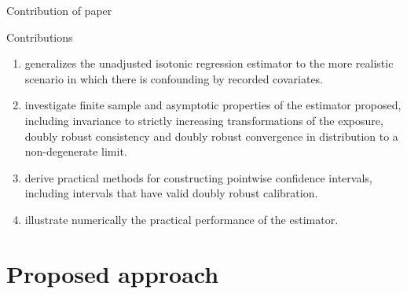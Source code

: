 \documentclass{beamer}
\newcommand{\fn}[1]{{\footnotesize #1}}
\begin{document}
\begin{frame}{Contribution of paper}
\begin{block}{Contributions}
	\fn{
\begin{enumerate}
	\item generalizes the unadjusted isotonic regression estimator to the more realistic scenario in which there is confounding by recorded covariates.

	\item investigate finite sample and asymptotic properties of the estimator proposed, including invariance to strictly increasing transformations of the exposure, doubly robust consistency	and doubly robust convergence in distribution to a non-degenerate limit.

	\item derive practical methods for constructing pointwise confidence intervals, including intervals that have valid doubly robust calibration.

	\item illustrate numerically the practical performance of the estimator.
\end{enumerate}
}
\end{block}
\end{frame}

\section{Proposed approach}
\end{document}
